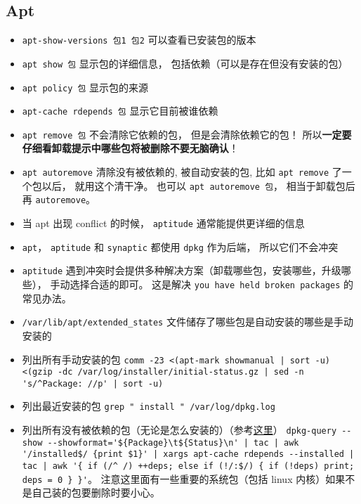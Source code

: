 
\begin{issues}
\issueDraft
\end{issues}

\subsection{Apt}
\begin{itemize}
\item \verb`apt-show-versions 包1 包2` 可以查看已安装包的版本
\item \verb`apt show 包` 显示包的详细信息， 包括依赖（可以是存在但没有安装的包）
\item \verb`apt policy 包` 显示包的来源
\item \verb`apt-cache rdepends 包` 显示它目前被谁依赖
\item \verb`apt remove 包` 不会清除它依赖的包， 但是会清除依赖它的包！ 所以\textbf{一定要仔细看卸载提示中哪些包将被删除不要无脑确认}！
\item \verb`apt autoremove` 清除没有被依赖的, 被自动安装的包, 比如 \verb`apt remove` 了一个包以后， 就用这个清干净。 也可以 \verb`apt autoremove 包`， 相当于卸载包后再 \verb`autoremove`。
\item 当 apt 出现 conflict 的时候， \verb`aptitude` 通常能提供更详细的信息
\item \verb`apt`， \verb`aptitude` 和 \verb`synaptic` 都使用 \verb`dpkg` 作为后端， 所以它们不会冲突
\item \verb`aptitude` 遇到冲突时会提供多种解决方案（卸载哪些包，安装哪些，升级哪些）， 手动选择合适的即可。 这是解决 \verb`you have held broken packages` 的常见办法。
\item \verb`/var/lib/apt/extended_states` 文件储存了哪些包是自动安装的哪些是手动安装的
\item 列出所有手动安装的包 \verb`comm -23 <(apt-mark showmanual | sort -u) <(gzip -dc /var/log/installer/initial-status.gz | sed -n 's/^Package: //p' | sort -u)`
\item 列出最近安装的包 \verb`grep " install " /var/log/dpkg.log`
\item 列出所有没有被依赖的包（无论是怎么安装的）（参考\href{https://askubuntu.com/questions/1114733/how-do-i-list-all-packages-that-no-package-depends-on}{这里}） \verb`dpkg-query --show --showformat='${Package}\t${Status}\n' | tac | awk '/installed$/ {print $1}' | xargs apt-cache rdepends --installed | tac | awk '{ if (/^ /) ++deps; else if (!/:$/) { if (!deps) print; deps = 0 } }'`。 注意这里面有一些重要的系统包（包括 linux 内核）如果不是自己装的包要删除时要小心。

\end{itemize}
